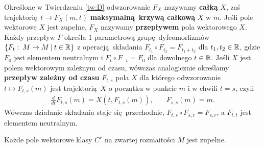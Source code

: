 Określone w Twierdzeniu \ref{tw:D} odwzorowanie \(F_X\) nazywamy \textbf{całką} \(X\), zaś trajektorię \(t\rightarrow F_X(m,t)\) \textbf{maksymalną krzywą całkową} \(X\) w \(m\). Jeśli pole wektorowe \(X\) jest zupełne, \(F_X\) nazywamy \textbf{przepływem} pola wektorowego \(X\). Każdy przepływ \(F\) określa 1-parametrową grupę dyfeomorfizmów \(\{F_t:\:M\rightarrow M\:|\: t\in \mathbb{R}\}\) z operacją składania \(F_{t_1}\circ F_{t_2} = F_{t_1 + t_2}\) dla \(t_{1}, {t}_2 \in \mathbb{R}\), gdzie \(F_0\) jest elementem neutralnym i \(F_{t}\circ F_{-t} = F_{0}\) dla dowolnego \(t\in\mathbb{R}\). Jeśli \(X\) jest polem wektorowym zależnym od czasu, wówczas analogicznie określamy \textbf{przepływ zależny od czasu} \(F_{t,s}\) pola \(X\) dla którego odwzorowanie \(t\mapsto F_{t,s}(m)\) jest trajektorią \(X\) o początku w punkcie \(m\) i w chwili \(t=s\), czyli
\begin{align}
\frac{d}{dt}F_{t,s}(m) = X\left(t, F_{t,s}(m)\right), &\quad F_{s,s}(m) = m.
\end{align} 
Wówczas działanie składania staje się przechodnie, \(F_{t,s}\circ F_{s,r} = F_{s, r}\), a \(F_{t, t}\) jest elementem neutralnym. 
\begin{twierdzenie}
Każde pole wektorowe klasy \(C^r\) na zwartej rozmaitości \(M\) jest zupełne.
\end{twierdzenie}

